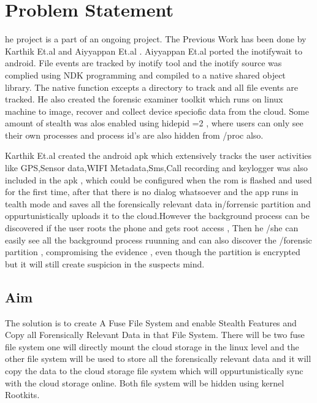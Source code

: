 %
%
\let\textcircled=\pgftextcircled
\chapter{Problem Statement}
\label{chap:problem statement}

he project is a part of an ongoing project. The Previous Work has been done by Karthik Et.al \cite{karthik_2016} and Aiyyappan Et.al \cite{aiyyappan_2015}. Aiyyappan Et.al ported the inotifywait to android. File events are tracked by inotify tool and the inotify source was complied using NDK programming and compiled to a native shared object library. The native function excepts a directory to track and all file events are tracked. He also created the forensic examiner toolkit which runs on linux machine to image, recover and collect device speciofic data from the cloud. Some amount of stealth was alos enabled using hidepid =2 , where users can only see their own processes and process id's are also hidden from /proc also.

Karthik Et.al created the android apk which extensively tracks the user activities like GPS,Sensor data,WIFI Metadata,Sms,Call recording and keylogger was also included in the apk , which could be configured when the rom is flashed and used for the first time, after that there is no dialog whatsoever and the app runs in tealth mode and saves all the forensically relevant data in/forrensic partition and oppurtunistically uploads it to the cloud.However the background process can be discovered if the user roots the phone and gets root access , Then he /she can easily see all the background process ruunning and can also discover the /forensic partition , compromising the evidence , even though the partition is encrypted but it will still create suspicion in the suspects mind. 
\section{Aim}
The solution is to create A Fuse File System and enable Stealth Features and Copy all 
Forensically Relevant Data in that File System. There will be two fuse file system one will directly mount the cloud storage in the linux level and the other file system will be used to store all the forensically relevant data and it will copy the data to the cloud storage file system which will oppurtunistically sync with the cloud storage online. Both file system will be hidden using kernel Rootkits.
